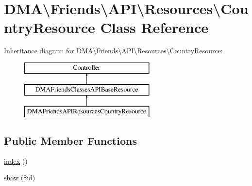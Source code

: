 \hypertarget{classDMA_1_1Friends_1_1API_1_1Resources_1_1CountryResource}{}\section{D\+M\+A\textbackslash{}Friends\textbackslash{}A\+P\+I\textbackslash{}Resources\textbackslash{}Country\+Resource Class Reference}
\label{classDMA_1_1Friends_1_1API_1_1Resources_1_1CountryResource}
Inheritance diagram for D\+M\+A\textbackslash{}Friends\textbackslash{}A\+P\+I\textbackslash{}Resources\textbackslash{}Country\+Resource\+:\begin{figure}[H]
\begin{center}
\leavevmode
\includegraphics[height=3.000000cm]{da/d31/classDMA_1_1Friends_1_1API_1_1Resources_1_1CountryResource}
\end{center}
\end{figure}
\subsection*{Public Member Functions}
\begin{DoxyCompactItemize}
\item 
\hyperlink{classDMA_1_1Friends_1_1API_1_1Resources_1_1CountryResource_a27853d23b31a060be59f8f3b97b73369}{index} ()
\item 
\hyperlink{classDMA_1_1Friends_1_1API_1_1Resources_1_1CountryResource_a0ab214a2497e38c94654a1dc37d13a5c}{show} (\$id)
\end{DoxyCompactItemize}
